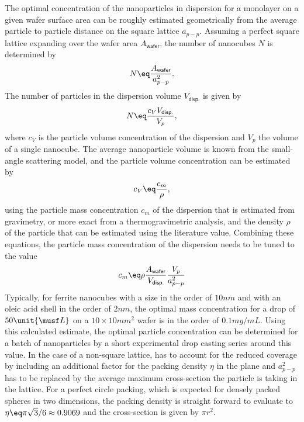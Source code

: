 \documentclass[\main/dresen_thesis.tex]{subfiles}
\begin{document}
    The optimal concentration of the nanoparticles in dispersion for a monolayer on a given wafer surface area can be roughly estimated geometrically from the average particle to particle distance on the square lattice $a_{p-p}$.
    Assuming a perfect square lattice expanding over the wafer area $A_{\textsf{wafer}}$, the number of nanocubes $N$ is determined by
    \begin{align}
      N \eq \frac{A_{\textsf{wafer}}}{a_{p-p}^2}.
    \end{align}
    The number of particles in the dispersion volume $V_{\textsf{disp.}}$ is given by
    \begin{align}
      N \eq \frac{c_V V_{\textsf{disp.}}}{V_p},
    \end{align}
    where $c_V$ is the particle volume concentration of the dispersion and $V_p$ the volume of a single nanocube.
    The average nanoparticle volume is known from the small-angle scattering model, and the particle volume concentration can be estimated by
    \begin{align}
      c_V \eq \frac{c_m}{\rho},
    \end{align}
    using the particle mass concentration $c_m$ of the dispersion that is estimated from gravimetry, or more exact from a thermogravimetric analysis, and the density $\rho$ of the particle that can be estimated using the literature value.
    Combining these equations, the particle mass concentration of the dispersion needs to be tuned to the value
    \begin{align}\label{eq:monolayers:preparation:particleConcentration}
      c_m \eq \rho \frac{A_{\textsf{wafer}}}{V_{\textsf{disp.}}} \frac{V_p}{a_{p-p}^2}
    \end{align}
    Typically, for ferrite nanocubes with a size in the order of $10 \unit{nm}$ and with an oleic acid shell in the order of $2 \unit{nm}$, the optimal mass concentration for a drop of $50 \unit{\musf L}$ on a $10\times 10 \unit{mm^2}$ wafer is in the order of $0.1 \unit{mg/mL}$.
    Using this calculated estimate, the optimal particle concentration can be determined for a batch of nanoparticles by a short experimental drop casting series around this value.
    In the case of a non-square lattice,  has to account for the reduced coverage by including an additional factor for the packing density $\eta$ in the plane and $a_{p-p}^2$ has to be replaced by the average maximum cross-section the particle is taking in the lattice.
    For a perfect circle packing, which is expected for densely packed spheres in two dimensions, the packing density is straight forward to evaluate to $\eta \eq \pi \sqrt{3} / 6 \approx 0.9069$ and the cross-section is given by $\pi r^2$.
\end{document}
